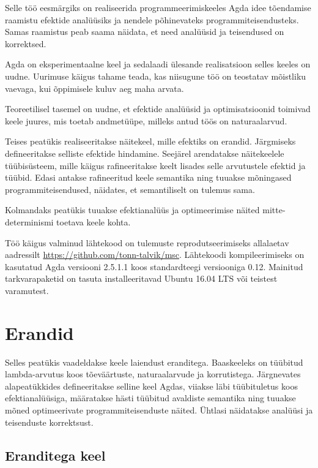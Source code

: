 \documentclass[a4paper,12pt]{article}
\begin{document}
Selle töö eesmärgiks on realiseerida programmeerimiskeeles Agda idee tõendamise
raamistu efektide analüüsiks ja nendele põhinevateks programmiteisendusteks.
Samas raamistus peab saama näidata, et need analüüsid ja teisendused on korrektsed.

Agda on eksperimentaalne keel ja sedalaadi ülesande realisatsioon selles keeles on uudne.
Uurimuse käigus tahame teada, kas niisugune töö on teostatav mõistliku vaevaga, kui õppimisele kuluv aeg maha arvata.

Teoreetilisel tasemel on uudne, et efektide analüüsid ja optimisatsioonid toimivad keele juures, mis toetab andmetüüpe, milleks antud töös on naturaalarvud. 

Teises peatükis realiseeritakse näitekeel, mille efektiks on erandid.
Järgmiseks defineeritakse selliste efektide hindamine.
Seejärel arendatakse näitekeelele tüübisüsteem, mille käigus rafineeritakse keelt lisades selle arvutustele efektid ja tüübid.
Edasi antakse rafineeritud keele semantika ning tuuakse mõningased programmiteisendused, näidates, et semantiliselt on tulemus sama.

Kolmandaks peatükis tuuakse efektianalüüs ja optimeerimise näited mitte-determinismi toetava keele kohta.

Töö käigus valminud lähtekood on tulemuste reprodutseerimiseks allalaetav aadressilt \url{https://github.com/tonn-talvik/msc}.
Lähtekoodi kompileerimiseks on kasutatud Agda versiooni 2.5.1.1 koos standardteegi versiooniga 0.12.
Mainitud tarkvarapaketid on tasuta installeeritavad Ubuntu 16.04 LTS või teistest varamutest.

\clearpage\vspace*{0pt}

\section{Erandid}

Selles peatükis vaadeldakse keele laiendust eranditega. 
Baaskeeleks on tüübitud lambda-arvutus koos tõeväärtuste, naturaalarvude ja korrutistega.
Järgnevates alapeatükkides defineeritakse selline keel Agdas,
viiakse läbi tüübituletus koos efektianalüüsiga,
määratakse hästi tüübitud avaldiste semantika
ning tuuakse mõned optimeerivate programmiteisenduste näited.
Ühtlasi näidatakse analüüsi ja teisenduste korrektsust.

\subsection{Eranditega keel}\label{ssec:exc.raw}
\end{document}
